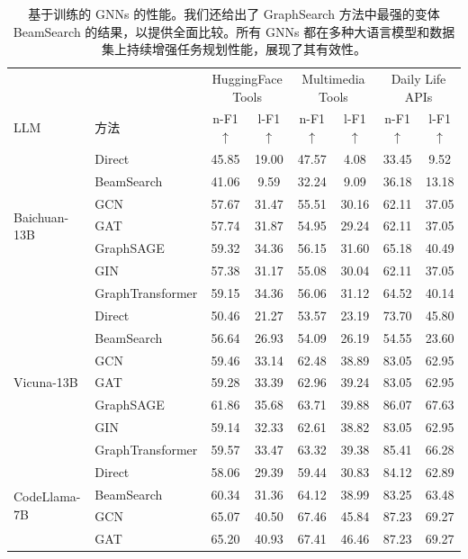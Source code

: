 \documentclass[11pt,UTF8,fontset=fandol]{ctexart}
\begin{document}
\begin{table}[H]\centering
\caption{基于训练的 GNNs 的性能。我们还给出了 GraphSearch 方法中最强的变体 BeamSearch 的结果，以提供全面比较。所有 GNNs 都在多种大语言模型和数据集上持续增强任务规划性能，展现了其有效性。}
\label{tab:11}
\scriptsize
\setlength{\tabcolsep}{4pt}
\begin{tabular}{llcc cc cc}
\toprule
& & \multicolumn{2}{c}{HuggingFace Tools} & \multicolumn{2}{c}{Multimedia Tools} & \multicolumn{2}{c}{Daily Life APIs}\\
\cmidrule(lr){3-4}\cmidrule(lr){5-6}\cmidrule(lr){7-8}
LLM & 方法 & n-F1$\uparrow$ & l-F1$\uparrow$ & n-F1$\uparrow$ & l-F1$\uparrow$ & n-F1$\uparrow$ & l-F1$\uparrow$\\
\midrule
\multirow{7}{*}{Baichuan-13B}
& Direct & 45.85 & 19.00 & 47.57 & 4.08 & 33.45 & 9.52\\
& BeamSearch & 41.06 & 9.59 & 32.24 & 9.09 & 36.18 & 13.18\\
& GCN & 57.67 & 31.47 & 55.51 & 30.16 & 62.11 & 37.05\\
& GAT & 57.74 & 31.87 & 54.95 & 29.24 & 62.11 & 37.05\\
& GraphSAGE & 59.32 & 34.36 & 56.15 & 31.60 & 65.18 & 40.49\\
& GIN & 57.38 & 31.17 & 55.08 & 30.04 & 62.11 & 37.05\\
& GraphTransformer & 59.15 & 34.36 & 56.06 & 31.12 & 64.52 & 40.14\\
\midrule
\multirow{7}{*}{Vicuna-13B}
& Direct & 50.46 & 21.27 & 53.57 & 23.19 & 73.70 & 45.80\\
& BeamSearch & 56.64 & 26.93 & 54.09 & 26.19 & 54.55 & 23.60\\
& GCN & 59.46 & 33.14 & 62.48 & 38.89 & 83.05 & 62.95\\
& GAT & 59.28 & 33.39 & 62.96 & 39.24 & 83.05 & 62.95\\
& GraphSAGE & 61.86 & 35.68 & 63.71 & 39.88 & 86.07 & 67.63\\
& GIN & 59.14 & 32.33 & 62.61 & 38.82 & 83.05 & 62.95\\
& GraphTransformer & 59.57 & 33.47 & 63.32 & 39.38 & 85.41 & 66.28\\
\midrule
\multirow{7}{*}{CodeLlama-7B}
& Direct & 58.06 & 29.39 & 59.44 & 30.83 & 84.12 & 62.89\\
& BeamSearch & 60.34 & 31.36 & 64.12 & 38.99 & 83.25 & 63.48\\
& GCN & 65.07 & 40.50 & 67.46 & 45.84 & 87.23 & 69.27\\
& GAT & 65.20 & 40.93 & 67.41 & 46.46 & 87.23 & 69.27\\

\end{tabular}
\end{table}
\end{document}

